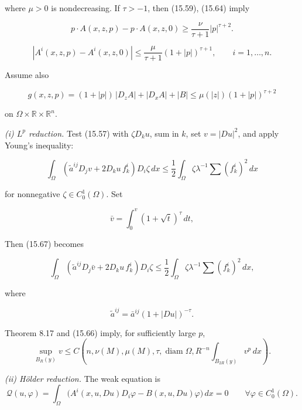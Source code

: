 where \(\mu>0\) is nondecreasing. If \(\tau>-1\), then (15.59), (15.64) imply

\[
p\cdot A(x,z,p)-p\cdot A(x,z,0)\ge \frac{\nu}{\tau+1}|p|^{\tau+2}.
\]

\begin{equation}
|A^i(x,z,p)-A^i(x,z,0)|\le \frac{\mu}{\tau+1}(1+|p|)^{\tau+1},\qquad i=1,\dots,n.
\tag{15.65}
\end{equation}

Assume also

\begin{equation}
g(x,z,p)=(1+|p|)\,|D_z A|+|D_x A|+|B|\le \mu(|z|)(1+|p|)^{\tau+2}
\tag{15.66}
\end{equation}

on \(\Omega\times\mathbb R\times\mathbb R^n\).

\medskip

\noindent\textit{(i) \(L^p\) reduction.}
Test (15.57) with \(\zeta D_ku\), sum in \(k\), set \(v=|Du|^2\), and
apply Young's inequality:

\begin{equation}
\int_{\Omega}\left(\tilde{a}^{ij}D_j v+2D_k u\,f_k^i\right)D_i\zeta\,dx\le \frac12\int_{\Omega}\zeta\lambda^{-1}\sum (f_k^i)^2\,dx
\tag{15.67}
\end{equation}

for nonnegative \(\zeta\in C_0^1(\Omega)\). Set

\[
\bar{v}=\int_0^v (1+\sqrt{t})^\tau\,dt,
\]

Then (15.67) becomes

\begin{equation}
\int_{\Omega}\left(\tilde{a}^{ij}D_j \bar{v}+2D_k u\,f_k^i\right)D_i\zeta\le \frac12\int_{\Omega}\zeta\lambda^{-1}\sum (f_k^i)^2\,dx,
\tag{15.68}
\end{equation}

where

\[
\tilde{a}^{ij}=\bar{a}^{ij}(1+|Du|)^{-\tau}.
\]


Theorem 8.17 and (15.66) imply, for sufficiently large \(p\),
\begin{equation}
\sup_{B_R(y)} v \le C(n,\nu(M),\mu(M),\tau,\operatorname{diam}\Omega,R^{-n}\int_{B_{2R}(y)} v^p\,dx).
\tag{15.69}
\end{equation}

\noindent\textit{(ii) H\"older reduction.}
The weak equation is
\begin{equation}
\mathcal{Q}(u,\varphi)=\int_{\Omega}\bigl(A^i(x,u,Du)D_i\varphi-B(x,u,Du)\varphi\bigr)\,dx=0 \qquad \forall \varphi\in C_0^1(\Omega).
\tag{15.70}
\end{equation}

